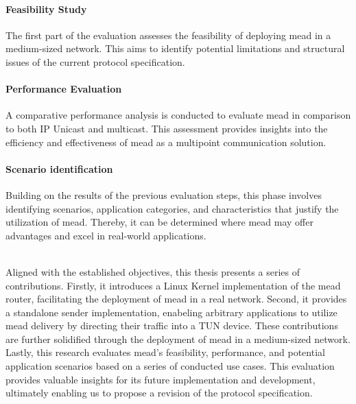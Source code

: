 \paragraph{Feasibility Study} %
\label{par:Feasibility Study}
The first part of the evaluation assesses the feasibility of deploying
    \gls{mead} in a medium-sized network.
This aims to identify potential limitations and structural issues of the
    current protocol specification.

\paragraph{Performance Evaluation} %
\label{par:Performance Evaluation}
A comparative performance analysis is conducted to evaluate \gls{mead} in
    comparison to both IP Unicast and multicast.
This assessment provides insights into the efficiency and effectiveness of
    \gls{mead} as a multipoint communication solution.

\paragraph{Scenario identification} %
\label{par:Scenario identification}
Building on the results of the previous evaluation steps, this phase involves
    identifying scenarios, application categories, and characteristics that
    justify the utilization of \gls{mead}.
Thereby, it can be determined where \gls{mead} may offer advantages and excel in
    real-world applications.
    
\noindent\\
Aligned with the established objectives, this thesis presents a series of
    contributions.
Firstly, it introduces a Linux Kernel implementation of the \gls{mead} router,
    facilitating the deployment of \gls{mead} in a real network.
Second, it provides a standalone sender implementation, enabeling arbitrary 
    applications to utilize \gls{mead} delivery by directing their traffic into
    a TUN device.
These contributions are further solidified through the deployment of \gls{mead}
    in a medium-sized network.
Lastly, this research evaluates \gls{mead}'s feasibility, performance, and
    potential application scenarios based on a series of conducted use cases.
This evaluation provides valuable insights for its future implementation and
    development, ultimately enabling us to propose a revision of the protocol
    specification.

